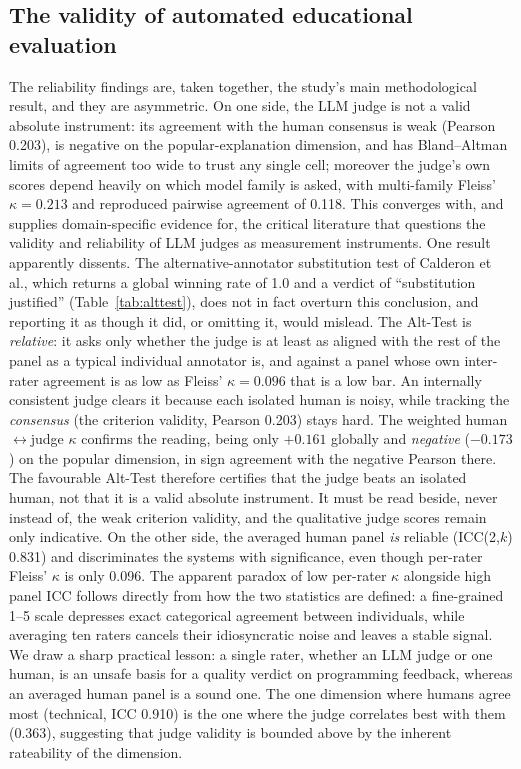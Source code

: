 \documentclass[sageh]{sagej}
\begin{document}
\subsection{The validity of automated educational evaluation}
The reliability findings are, taken together, the study's main methodological result, and they are asymmetric. On one side, the LLM judge is not a valid absolute instrument: its agreement with the human consensus is weak (Pearson 0.203), is negative on the popular-explanation dimension, and has Bland--Altman limits of agreement too wide to trust any single cell; moreover the judge's own scores depend heavily on which model family is asked, with multi-family Fleiss' $\kappa=0.213$ and reproduced pairwise agreement of 0.118. This converges with, and supplies domain-specific evidence for, the critical literature that questions the validity and reliability of LLM judges as measurement instruments.\cite{chehbouni2025neither,li2025scoringbias,hackl2023gpt4,yamauchi2025judge} One result apparently dissents. The alternative-annotator substitution test of Calderon et al.,\cite{calderon2025alttest} which returns a global winning rate of 1.0 and a verdict of ``substitution justified'' (Table~\ref{tab:alttest}), does not in fact overturn this conclusion, and reporting it as though it did, or omitting it, would mislead. The Alt-Test is \emph{relative}: it asks only whether the judge is at least as aligned with the rest of the panel as a typical individual annotator is, and against a panel whose own inter-rater agreement is as low as Fleiss' $\kappa=0.096$ that is a low bar. An internally consistent judge clears it because each isolated human is noisy, while tracking the \emph{consensus} (the criterion validity, Pearson 0.203) stays hard. The weighted human$\leftrightarrow$judge $\kappa$ confirms the reading, being only $+0.161$ globally and \emph{negative} ($-0.173$) on the popular dimension, in sign agreement with the negative Pearson there. The favourable Alt-Test therefore certifies that the judge beats an isolated human, not that it is a valid absolute instrument. It must be read beside, never instead of, the weak criterion validity, and the qualitative judge scores remain only indicative. On the other side, the averaged human panel \emph{is} reliable (ICC(2,$k$) 0.831) and discriminates the systems with significance, even though per-rater Fleiss' $\kappa$ is only 0.096. The apparent paradox of low per-rater $\kappa$ alongside high panel ICC follows directly from how the two statistics are defined: a fine-grained 1--5 scale depresses exact categorical agreement between individuals, while averaging ten raters cancels their idiosyncratic noise and leaves a stable signal.\cite{shrout1979icc,mcgraw1996icc,fleiss1971kappa} We draw a sharp practical lesson: a single rater, whether an LLM judge or one human, is an unsafe basis for a quality verdict on programming feedback, whereas an averaged human panel is a sound one. The one dimension where humans agree most (technical, ICC 0.910) is the one where the judge correlates best with them (0.363), suggesting that judge validity is bounded above by the inherent rateability of the dimension.
\end{document}
